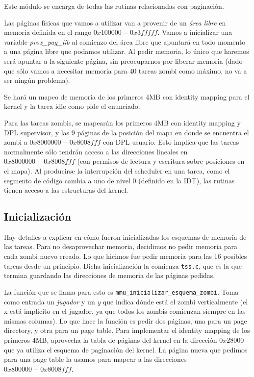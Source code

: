 \documentclass{article}
\begin{document}
	Este módulo se encarga de todas las rutinas relacionadas con paginación.

	Las páginas físicas que vamos a utilizar van a provenir de un \textit{área libre} en memoria definida en el rango $0x100000 - 0x3fffff$. Vamos a inicializar una variable \textit{prox\_pag\_lib} al comienzo del área libre que apuntará en todo momento a una página libre que podamos utilizar. Al pedir memoria, lo único que haremos será apuntar a la siguiente página, sin preocuparnos por liberar memoria (dado que sólo vamos a necesitar memoria para $40$ tareas zombi como máximo, no va a ser ningún problema).

	Se hará un mapeo de memoria de los primeros 4MB con identity mapping para el kernel y la tarea idle como pide el enunciado.

	Para las tareas zombis, se mapearán los primeros 4MB con identity mapping y DPL supervisor, y las 9 páginas de la posición del mapa en donde se encuentra el zombi a $0x8000000 - 0x8008fff$ con DPL usuario. Esto implica que las tareas normalmente sólo tendrán acceso a las direcciones lineales en $0x8000000 - 0x8008fff$ (con permisos de lectura y escritura sobre posiciones en el mapa). Al producirse la interrupción del scheduler en una tarea, como el segmento de código cambia a uno de nivel 0 (definido en la IDT), las rutinas tienen acceso a las estructuras del kernel.

	\subsection*{Inicialización}

	Hay detalles a explicar en cómo fueron inicializadas los esquemas de memoria de las tareas. Para no desaprovechar memoria, decidimos no pedir memoria para cada zombi nuevo creado. Lo que hicimos fue pedir memoria para las 16 posibles tareas desde un principio. Dicha inicialización la comienza \texttt{tss.c}, que es la que termina guardando las direcciones de memoria de las páginas pedidas.

	La función que se llama para esto es \texttt{mmu\_inicializar\_esquema\_zombi}. Toma como entrada un \textit{jugador} y un \textit{y} que indica dónde está el zombi verticalmente (el x está implicito en el jugador, ya que todos los zombis comienzan siempre en las mismas columas). Lo que hace la función es pedir dos páginas, una para un page directory, y otra para un page table. Para implementar el identity mapping de los primeros 4MB, aprovecha la tabla de páginas del kernel en la dirección $0x28000$ que ya utiliza el esquema de paginación del kernel. La página nueva que pedimos para una page table la usamos para mapear a las direcciones $0x800000- 0x8008fff$.
\end{document}
